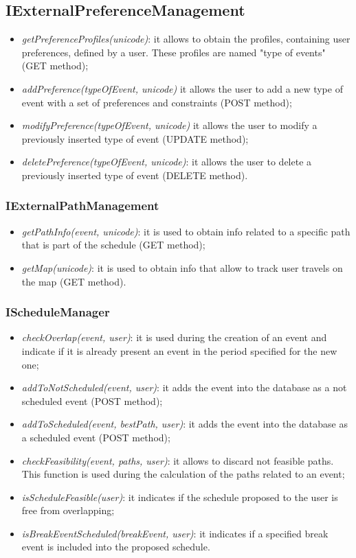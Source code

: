 \subsection{IExternalPreferenceManagement}
\begin{itemize}
\item \textit{getPreferenceProfiles(unicode)}: it allows to obtain the profiles, containing user preferences, defined by a user. These profiles are named "type of events" (GET method);
\item \textit{addPreference(typeOfEvent, unicode)} it allows the user to add a new type of event with a set of preferences and constraints (POST method);
\item \textit{modifyPreference(typeOfEvent, unicode)} it allows the user to modify a previously inserted type of event (UPDATE method);
\item \textit{deletePreference(typeOfEvent, unicode)}: it allows the user to delete a previously inserted type of event (DELETE method).
\end{itemize}
\subsubsection{IExternalPathManagement}
\begin{itemize}
\item \textit{getPathInfo(event, unicode)}: it is used to obtain info related to a specific path that is part of the schedule (GET method);
\item \textit{getMap(unicode)}: it is used to obtain info that allow to track user travels on the map (GET method).
\end{itemize}
\subsubsection{IScheduleManager}
\begin{itemize}
\item \textit{checkOverlap(event, user)}: it is used during the creation of an event and indicate if it is already present an event in the period specified for the new one;
\item \textit{addToNotScheduled(event, user)}: it adds the event into the database as a not scheduled event (POST method);
\item \textit{addToScheduled(event, bestPath, user)}: it adds the event into the database as a scheduled event (POST method);
\item \textit{checkFeasibility(event, paths, user)}: it allows to discard not feasible paths. This function is used during the calculation of the paths related to an event;
\item \textit{isScheduleFeasible(user)}: it indicates if the schedule proposed to the user is free from overlapping;
\item \textit{isBreakEventScheduled(breakEvent, user)}: it indicates if a specified break event is included into the proposed schedule.
\end{itemize}
